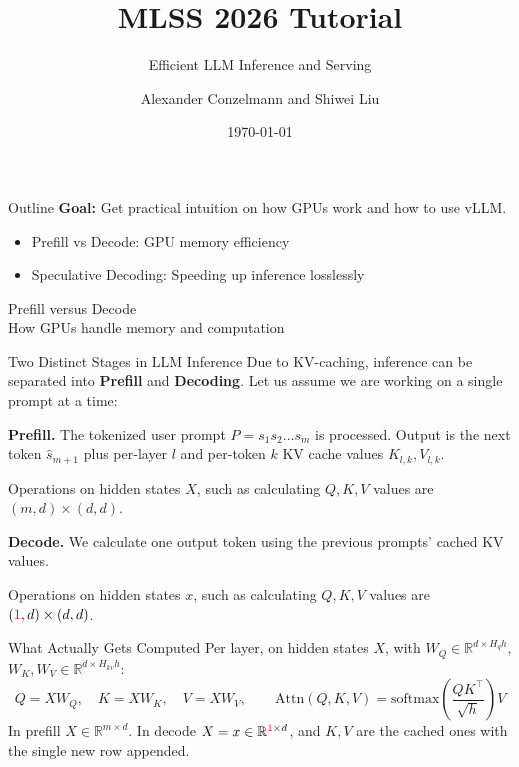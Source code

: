 \documentclass[aspectratio=169, 11pt]{beamer}
\title{MLSS 2026 Tutorial}
\subtitle{Efficient LLM Inference and Serving}
\author{Alexander Conzelmann and Shiwei Liu}
\date{\today}
\begin{document}
\maketitle

\begin{frame}{Outline}
  \textbf{Goal:} Get practical intuition on how GPUs work and how to use vLLM. 
  \begin{itemize}
    \item Prefill vs Decode: GPU memory efficiency 
    \item Speculative Decoding: Speeding up inference losslessly
  \end{itemize}
\end{frame}

\begin{frame}[standout]
  Prefill versus Decode \\ \small How GPUs handle memory and computation
\end{frame}

\begin{frame}{Two Distinct Stages in LLM Inference}
Due to KV-caching, inference can be separated into \textbf{Prefill} and \textbf{Decoding}. Let us assume
we are working on a single prompt at a time:

\textbf{Prefill.} The tokenized user prompt $P = s_1 s_2 \ldots s_m$ is processed. Output is the next token 
$\hat{s}_{m+1}$ plus per-layer $l$ and per-token $k$ KV cache values $K_{l,k}, V_{l,k}$.

Operations on hidden states $X$, such as  calculating $Q,K,V$ values are $(m, d) \times (d,d)$.

\textbf{Decode.} We calculate one output token using the previous prompts' cached KV values. 

Operations on hidden states $x$, such as  calculating $Q,K,V$ values are $({\color{red}1}, d) \times (d,d)$.
\end{frame}

\begin{frame}{What Actually Gets Computed}
Per layer, on hidden states $X$, with $W_Q \in \mathbb{R}^{d \times H_q h}$, $W_K, W_V \in \mathbb{R}^{d \times H_{kv} h}$:
\[
  Q = X W_Q, \quad K = X W_K, \quad V = X W_V,
  \qquad
  \mathrm{Attn}(Q,K,V) = \mathrm{softmax}\!\left(\frac{QK^\top}{\sqrt{h}}\right) V
\]
In prefill $X \in \mathbb{R}^{m \times d}$. In decode $X = x \in \mathbb{R}^{{\color{red}1} \times d}$, and $K, V$ are the
cached ones with the single new row appended.

\end{frame}
\end{document}
